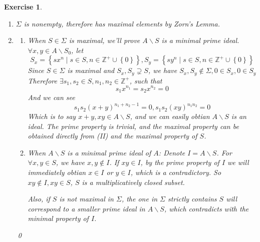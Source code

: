 \documentclass{article}
\theoremstyle{breakstyle}
\newtheorem{exercise}{Exercise}
\begin{document}
\begin{exercise}
    \leavevmode \vspace{-\baselineskip}
    \begin{enumerate}[label=({\roman*})]
        \item 
            $\Sigma$ is nonempty, therefore has maximal elements by \emph{Zorn's Lemma}.
        \item 
            \begin{enumerate}[label=({\Roman*})]
                \item When $S\in \Sigma$ is maximal, we'll prove $A\backslash S$ is a minimal prime ideal.
                    $\forall x,y\in A\backslash S_0$, let
                    $$
                    S_{x}=\left\{ sx^{n}\mid s \in S,n \in \mathbb{Z}^{+}\cup \left\{ 0 \right\}  \right\} ,S_{y}=\left\{ sy^{n}\mid s \in S,n \in \mathbb{Z}^{+}\cup \left\{ 0 \right\}  \right\} 
                    $$
                    Since $S\in \Sigma$ is maximal and $S_{x},S_{y}\supsetneq S$, we have $S_{x},S_{y}\not\in \Sigma,0\in S_{x},0\in S_{y}$
                    Therefore $\exists s_1,s_2\in S,n_1,n_2\in \mathbb{Z}^{+}$, such that
                    $$
                    s_1x^{n_1}=s_2x^{n_2}=0
                    $$
                    And we can see
                    $$
                    s_1s_2(x+y)^{n_1+n_2-1}=0,s_1s_2(xy)^{n_1n_2}=0
                    $$
                    Which is to say $x+y,xy\in A\backslash S$, and we can easily obtian $A\backslash S$ is an ideal.
                    The prime property is trivial, and the maximal property can be obtained directly from \emph{(II)} and the maximal property of $S$.
                \item When $A\backslash S$ is a minimal prime ideal of $A$:
                    Denote $I=A\backslash S$.
                    For $\forall x,y\in S$, we have $x,y\not\in I$.
                    If $xy\in I$, by the prime property of $I$ we will immediately obtian $x\in I$ or $y\in I$, which is a contradictory.
                    So $xy\not\in I,xy\in S$, $S$ is a  multiplicatively closed subset.

                    Also, if $S$ is not maximal in $\Sigma$,
                    the one in $\Sigma$ strictly contains $S$ will correspond to a smaller prime ideal in $A\backslash S$,
                    which contradicts with the minimal property of $I$.
            \end{enumerate}
            \qed
    \end{enumerate}
\end{exercise}
\end{document}
